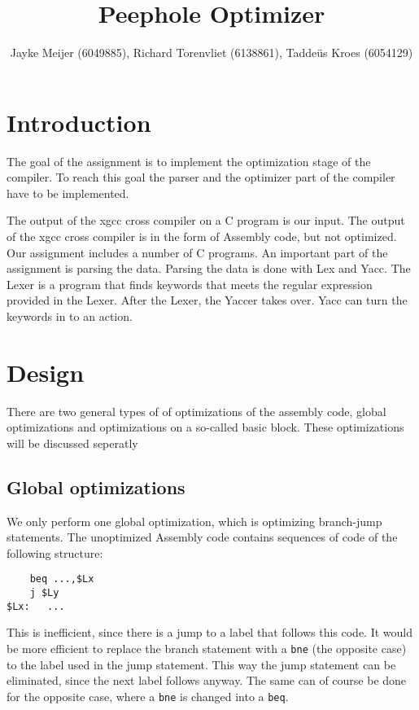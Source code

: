 \documentclass[10pt,a4paper]{article}
\title{Peephole Optimizer}
\author{Jayke Meijer (6049885), Richard Torenvliet (6138861), Tadde\"us Kroes
    (6054129)}
\begin{document}
\maketitle
\pagebreak
\tableofcontents
\pagebreak

\section{Introduction}

The goal of the assignment is to implement the optimization stage of the
compiler. To reach this goal the parser and the optimizer part of the compiler
have to be implemented.

The output of the xgcc cross compiler on a C program is our input. The output
of the xgcc cross compiler is in the form of Assembly code, but not optimized.
Our assignment includes a number of C programs. An important part of the
assignment is parsing the data. Parsing the data is done with Lex and Yacc. The
Lexer is a program that finds keywords that meets the regular expression
provided in the Lexer. After the Lexer, the Yaccer takes over. Yacc can turn
the keywords in to an action.

\section{Design}

There are two general types of of optimizations of the assembly code, global
optimizations and optimizations on a so-called basic block. These optimizations
will be discussed seperatly

\subsection{Global optimizations}

We only perform one global optimization, which is optimizing branch-jump
statements. The unoptimized Assembly code contains sequences of code of the
following structure:
\begin{verbatim}
    beq ...,$Lx
    j $Ly
$Lx:   ...
\end{verbatim}
This is inefficient, since there is a jump to a label that follows this code.
It would be more efficient to replace the branch statement with a \texttt{bne}
(the opposite case) to the label used in the jump statement. This way the jump
statement can be eliminated, since the next label follows anyway. The same can
of course be done for the opposite case, where a \texttt{bne} is changed into a
\texttt{beq}.
\end{document}

